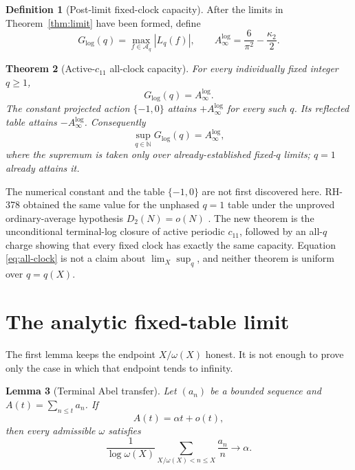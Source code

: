 \documentclass[11pt]{article}
\newtheorem{theorem}{Theorem}[section]
\newtheorem{lemma}[theorem]{Lemma}
\theoremstyle{definition}
\newtheorem{definition}[theorem]{Definition}
\theoremstyle{remark}
\newcommand{\kap}{\kappa_2}
\newcommand{\Alog}{A_{\infty}^{\log}}
\newcommand{\Glog}{G_{\log}}
\begin{document}
\begin{definition}[Post-limit fixed-clock capacity]
\label{def:capacity}
After the limits in Theorem~\ref{thm:limit} have been formed, define
\begin{equation}
 \Glog(q)=\max_{f\in\mathcal A_q}|L_q(f)|,
 \qquad
 \Alog=\frac6{\pi^2}-\frac{\kap}{2}.
 \label{eq:Glog}
\end{equation}
\end{definition}

\begin{theorem}[Active-$c_{11}$ all-clock capacity]
\label{thm:capacity}
For every individually fixed integer $q\ge1$,
\begin{equation}
 \boxed{\Glog(q)=\Alog.}
 \label{eq:fixed-capacity}
\end{equation}
The constant projected action $\{-1,0\}$ attains $+\Alog$ for every such
$q$.  Its reflected table attains $-\Alog$.  Consequently
\begin{equation}
 \boxed{\sup_{q\in\mathbb N}\Glog(q)=\Alog,}
 \label{eq:all-clock}
\end{equation}
where the supremum is taken only over already-established fixed-$q$
limits; $q=1$ already attains it.
\end{theorem}

The numerical constant and the table $\{-1,0\}$ are not first discovered
here.  RH-378 obtained the same value for the unphased $q=1$ table under
the unproved ordinary-average hypothesis $D_2(N)=o(N)$
\cite{RH378}.  The new theorem is the unconditional terminal-log closure of
active periodic $c_{11}$, followed by an all-$q$ charge showing that every
fixed clock has exactly the same capacity.  Equation \eqref{eq:all-clock}
is not a claim about $\lim_X\sup_q$, and neither theorem is uniform over
$q=q(X)$.

\section{The analytic fixed-table limit}

The first lemma keeps the endpoint $X/\omega(X)$ honest.  It is not enough
to prove only the case in which that endpoint tends to infinity.

\begin{lemma}[Terminal Abel transfer]
\label{lem:abel}
Let $(a_n)$ be a bounded sequence and
$A(t)=\sum_{n\le t}a_n$.  If
\begin{equation}
 A(t)=\alpha t+o(t),
 \label{eq:prefix-alpha}
\end{equation}
then every admissible $\omega$ satisfies
\begin{equation}
 \frac1{\log\omega(X)}
 \sum_{X/\omega(X)<n\le X}\frac{a_n}{n}
 \longrightarrow\alpha.
 \label{eq:abel-conclusion}
\end{equation}
\end{lemma}
\end{document}

